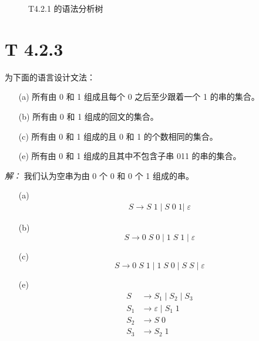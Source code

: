 \documentclass[12pt]{ctexart}
\begin{document}
    \begin{figure}[hp]
        \centering
        \caption{T4.2.1 的语法分析树}
        \label{fig:t1-parse-tree}
    \end{figure}

    \clearpage
    \newpage
    \section{T 4.2.3}

    为下面的语言设计文法：

    \begin{enumerate}
        \item[(a)] 所有由 0 和 1 组成且每个 0 之后至少跟着一个 1 的串的集合。
        \item[(b)] 所有由 0 和 1 组成的回文的集合。
        \item[(c)] 所有由 0 和 1 组成的且 0 和 1 的个数相同的集合。
        \item[(e)] 所有由 0 和 1 组成的且其中不包含子串 011 的串的集合。
    \end{enumerate}

    \emph{解：} 我们认为空串为由 0 个 0 和 0 个 1 组成的串。
    \begin{enumerate}
        \item[(a)] \begin{align*}
            S \to S\;1\;|\;S\;0\;1|\;\varepsilon
        \end{align*}
        \item[(b)] \[
            S \to 0\;S\;0\;|\;1\;S\;1\;|\;\varepsilon
        \]
        \item[(c)] \[
            S \to 0\;S\;1\;|\;1\;S\;0\;|\;S\;S\;|\;\varepsilon
        \]
        \item[(e)] \begin{align*}
            S   &\to S_1\;|\;S_2\;|\;S_3    \\
            S_1 &\to \varepsilon\;|\;S_1\;1 \\
            S_2 &\to S\;0                   \\
            S_3 &\to S_2\;1
        \end{align*}
    \end{enumerate}
\end{document}
